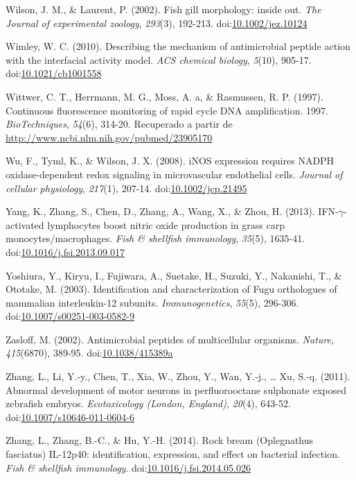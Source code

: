 \documentclass[12pt,letterpaper,oneside]{scrbook}
\begin{document}
Wilson, J. M., \& Laurent, P. (2002). Fish gill morphology: inside out.
\emph{The Journal of experimental zoology}, \emph{293}(3), 192-213.
doi:\href{http://dx.doi.org/10.1002/jez.10124}{10.1002/jez.10124}

Wimley, W. C. (2010). Describing the mechanism of antimicrobial peptide
action with the interfacial activity model. \emph{ACS chemical biology},
\emph{5}(10), 905-17.
doi:\href{http://dx.doi.org/10.1021/cb1001558}{10.1021/cb1001558}

Wittwer, C. T., Herrmann, M. G., Moss, A. a, \& Rasmussen, R. P. (1997).
Continuous fluorescence monitoring of rapid cycle DNA amplification.
1997. \emph{BioTechniques}, \emph{54}(6), 314-20. Recuperado a partir de
\url{http://www.ncbi.nlm.nih.gov/pubmed/23905170}

Wu, F., Tyml, K., \& Wilson, J. X. (2008). iNOS expression requires
NADPH oxidase-dependent redox signaling in microvascular endothelial
cells. \emph{Journal of cellular physiology}, \emph{217}(1), 207-14.
doi:\href{http://dx.doi.org/10.1002/jcp.21495}{10.1002/jcp.21495}

Yang, K., Zhang, S., Chen, D., Zhang, A., Wang, X., \& Zhou, H. (2013).
IFN-\(\gamma\)-activated lymphocytes boost nitric oxide production in
grass carp monocytes/macrophages. \emph{Fish \& shellfish immunology},
\emph{35}(5), 1635-41.
doi:\href{http://dx.doi.org/10.1016/j.fsi.2013.09.017}{10.1016/j.fsi.2013.09.017}

Yoshiura, Y., Kiryu, I., Fujiwara, A., Suetake, H., Suzuki, Y.,
Nakanishi, T., \& Ototake, M. (2003). Identification and
characterization of Fugu orthologues of mammalian interleukin-12
subunits. \emph{Immunogenetics}, \emph{55}(5), 296-306.
doi:\href{http://dx.doi.org/10.1007/s00251-003-0582-9}{10.1007/s00251-003-0582-9}

Zasloff, M. (2002). Antimicrobial peptides of multicellular organisms.
\emph{Nature}, \emph{415}(6870), 389-95.
doi:\href{http://dx.doi.org/10.1038/415389a}{10.1038/415389a}

Zhang, L., Li, Y.-y., Chen, T., Xia, W., Zhou, Y., Wan, Y.-j., \ldots{}
Xu, S.-q. (2011). Abnormal development of motor neurons in
perfluorooctane sulphonate exposed zebrafish embryos.
\emph{Ecotoxicology (London, England)}, \emph{20}(4), 643-52.
doi:\href{http://dx.doi.org/10.1007/s10646-011-0604-6}{10.1007/s10646-011-0604-6}

Zhang, L., Zhang, B.-C., \& Hu, Y.-H. (2014). Rock bream (Oplegnathus
fasciatus) IL-12p40: identification, expression, and effect on bacterial
infection. \emph{Fish \& shellfish immunology}.
doi:\href{http://dx.doi.org/10.1016/j.fsi.2014.05.026}{10.1016/j.fsi.2014.05.026}
\end{document}
